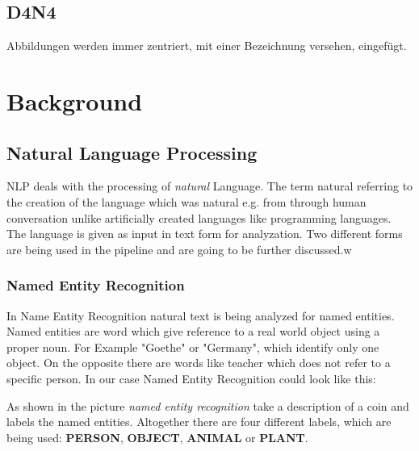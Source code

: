 \documentclass[12pt, oneside]{article}
\begin{document}
\subsection{D4N4}
Abbildungen werden immer zentriert, mit einer Bezeichnung versehen, eingefügt. 
\newpage
\section{Background}\label{bg}
\subsection{Natural Language Processing} \label{nlp}
NLP deals with the processing of \textit{natural} Language. The term natural referring to the creation of the language which was natural e.g. from through human conversation unlike artificially created languages like programming languages. The language is given as input in text form for analyzation.
Two different forms are being used in the pipeline and are going to be further discussed.w
\subsubsection{Named Entity Recognition} \label{ner}
In Name Entity Recognition natural text is being analyzed for  named entities. Named entities are word which give reference to a real world object using a proper noun. For Example "Goethe" or "Germany", which identify only one object. On the opposite there are words like teacher which does not refer to a specific person.
In our case Named Entity Recognition could look like this:
\begin{center}
\end{center}
As shown in the picture \textit{named entity recognition} take a description of a coin and labels the named entities. Altogether there are four different labels, which are being used: \textbf{PERSON}, \textbf{OBJECT}, \textbf{ANIMAL} or \textbf{PLANT}. 
\newpage
\end{document}
